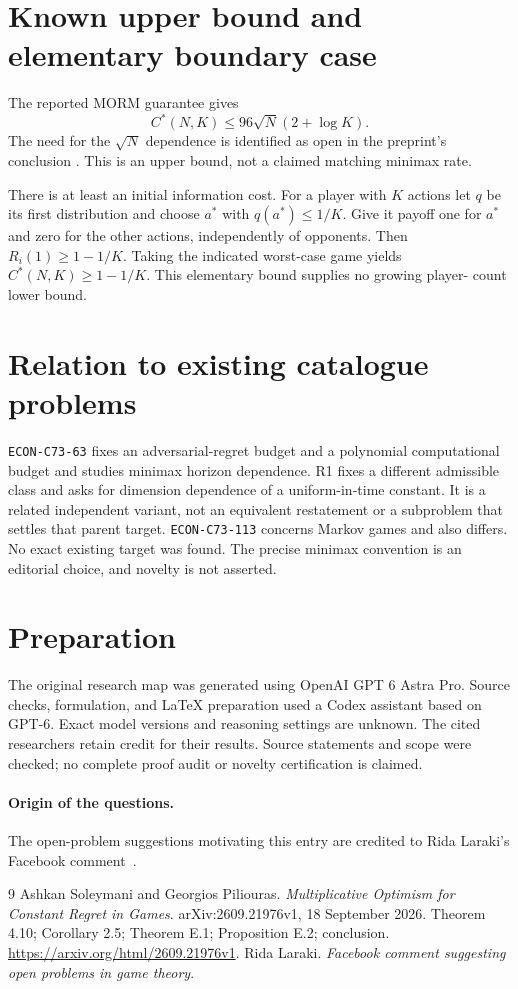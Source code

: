 \documentclass[11pt]{article}
\begin{document}
\section*{Known upper bound and elementary boundary case}
The reported MORM guarantee gives
\[
 C^*(N,K)\leq96\sqrt N(2+\log K).
\]
The need for the $\sqrt N$ dependence is identified as open in the
preprint's conclusion \cite{morm}. This is an upper bound, not a claimed
matching minimax rate.

There is at least an initial information cost. For a player with $K$
actions let $q$ be its first distribution and choose $a^*$ with
$q(a^*)\leq1/K$. Give it payoff one for $a^*$ and zero for the other
actions, independently of opponents. Then $R_i(1)\geq1-1/K$.
Taking the indicated worst-case game yields
$C^*(N,K)\geq1-1/K$. This elementary bound supplies no growing player-
count lower bound.

\section*{Relation to existing catalogue problems}
\texttt{ECON-C73-63} fixes an adversarial-regret budget and a polynomial
computational budget and studies minimax horizon dependence. R1 fixes
a different admissible class and asks for dimension dependence of a
uniform-in-time constant. It is a related independent variant, not an
equivalent restatement or a subproblem that settles that parent target.
\texttt{ECON-C73-113} concerns Markov games and also differs.
No exact existing target was found. The precise minimax convention is
an editorial choice, and novelty is not asserted.

\section*{Preparation}
The original research map was generated using OpenAI GPT 6 Astra Pro.
Source checks, formulation, and LaTeX preparation used a Codex assistant
based on GPT-6. Exact model versions and reasoning settings are unknown.
The cited researchers retain credit for their results. Source statements
and scope were checked; no complete proof audit or novelty certification
is claimed.
\paragraph{Origin of the questions.}
The open-problem suggestions motivating this entry are credited to
Rida Laraki's Facebook comment~\cite{laraki-facebook}.
\begin{thebibliography}{9}
Ashkan Soleymani and Georgios Piliouras.
\emph{Multiplicative Optimism for Constant Regret in Games}.
arXiv:2609.21976v1, 18 September 2026.
Theorem 4.10; Corollary 2.5; Theorem E.1; Proposition E.2; conclusion.
\url{https://arxiv.org/html/2609.21976v1}.
Rida Laraki.
\emph{Facebook comment suggesting open problems in game theory}.
\end{thebibliography}
\end{document}
